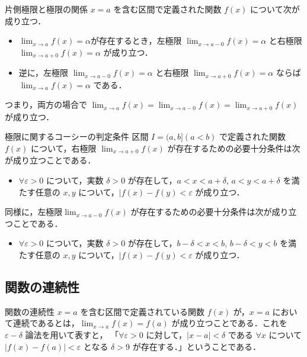 \documentclass[a4paper]{ltjsarticle}
\begin{document}
  \begin{theorem}{片側極限と極限の関係}{}
    $x = a$ を含む区間で定義された関数 $f(x)$ について次が成り立つ．
    \begin{itemize}
     \item $\lim_{x \to a} f(x) = \alpha$が存在するとき，左極限 $\lim_{x \to a -0} f(x) = \alpha$ と右極限 $\lim_{x \to a + 0} f(x) = \alpha$ が成り立つ．
     \item 逆に，左極限 $\lim_{x \to a -0} f(x) = \alpha$ と右極限 $\lim_{x \to a + 0} f(x) = \alpha$ ならば $\lim_{x \to a} f(x) = \alpha$ である．
    \end{itemize}
    つまり，両方の場合で $\lim_{x \to a} f(x) = \lim_{x \to a - 0} f(x) = \lim_{x \to a+0} f(x)$ が成り立つ．
  \end{theorem}

  \begin{theorem}{極限に関するコーシーの判定条件}{}
    区間 $I = (a, b] (a < b)$ で定義された関数 $f(x)$ について，右極限 $\lim_{x \to a+0} f(x)$ が存在するための必要十分条件は次が成り立つことである．
    \begin{itemize}
      \item $\forall \varepsilon > 0$ について，実数 $\delta > 0$ が存在して，$a < x < a + \delta$, $a < y < a + \delta$ を満たす任意の $x, y$ について，$|f(x) - f(y) < \varepsilon$ が成り立つ．
    \end{itemize}
    同様に，左極限$\lim_{x \to a-0} f(x)$ が存在するための必要十分条件は次が成り立つことである．
    \begin{itemize}
      \item $\forall \varepsilon > 0$ について，実数 $\delta > 0$ が存在して，$b-\delta < x < b$, $b-\delta < y < b$ を満たす任意の $x, y$ について，$|f(x) - f(y) < \varepsilon$ が成り立つ．
    \end{itemize}
  \end{theorem}

  \subsection{関数の連続性}
  \begin{tcb}{関数の連続性}{}
    $x = a$ を含む区間で定義されている関数 $f(x)$ が，$x = a$ において連続であるとは，$\lim_{x \to a} f(x) = f(a)$ が成り立つことである．これを $\varepsilon - \delta$ 論法を用いて表すと，
    「$\forall \varepsilon > 0$ に対して，$|x - a| < \delta$ である $\forall x$  について $|f(x) - f(a)| < \varepsilon$ となる $\delta > 9$ が存在する．」ということである．
  \end{tcb}
\end{document}
